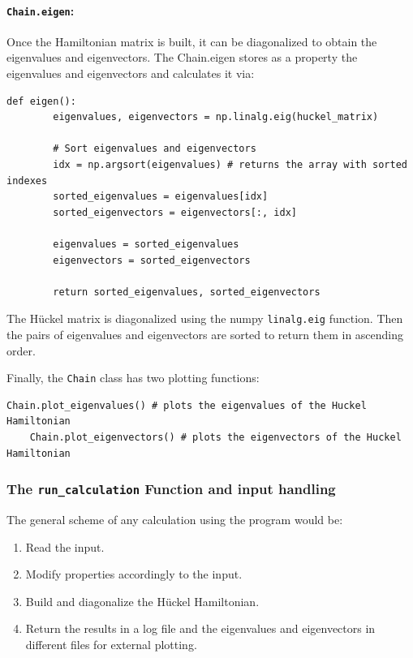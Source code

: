 \documentclass{article}
\begin{document}
\paragraph{\texttt{Chain.eigen}:} Once the Hamiltonian matrix is built, it can be diagonalized to obtain the eigenvalues and eigenvectors. The Chain.eigen stores as a property the eigenvalues and eigenvectors and calculates it via: 
\begin{lstlisting}[backgroundcolor=\color{LightGray}]
    def eigen():
        eigenvalues, eigenvectors = np.linalg.eig(huckel_matrix)
        
        # Sort eigenvalues and eigenvectors
        idx = np.argsort(eigenvalues) # returns the array with sorted indexes
        sorted_eigenvalues = eigenvalues[idx]
        sorted_eigenvectors = eigenvectors[:, idx]

        eigenvalues = sorted_eigenvalues
        eigenvectors = sorted_eigenvectors

        return sorted_eigenvalues, sorted_eigenvectors
\end{lstlisting} 
The Hückel matrix is diagonalized using the numpy \texttt{linalg.eig} function. Then the pairs of eigenvalues and eigenvectors are sorted to return them in ascending order. 

Finally, the \texttt{Chain} class has two plotting functions:
\begin{lstlisting}[backgroundcolor=\color{LightGray}]
    Chain.plot_eigenvalues() # plots the eigenvalues of the Huckel Hamiltonian
    Chain.plot_eigenvectors() # plots the eigenvectors of the Huckel Hamiltonian
\end{lstlisting} 

\subsubsection{The \texttt{run\_calculation} Function and input handling}
The general scheme of any calculation using the program would be:
\begin{enumerate}
    \item Read the input.
    \item Modify properties accordingly to the input.
    \item Build and diagonalize the Hückel Hamiltonian.
    \item Return the results in a log file and the eigenvalues and eigenvectors in different files for external plotting.
\end{enumerate}
\end{document}
